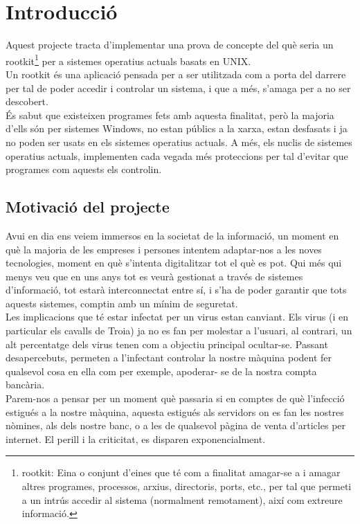 \chapter{Introducció}

Aquest projecte tracta d'implementar una prova de concepte del què seria un rootkit\footnote{rootkit:
Eina o conjunt d'eines que té com a finalitat amagar-se a i amagar altres programes, processos, arxius, 
directoris, ports, etc., per tal que permeti a un intrús accedir al sistema (normalment remotament), 
així com extreure informació.} per a sistemes operatius actuals basats en UNIX.\\ 

Un rootkit és una aplicació pensada per a ser utilitzada com a porta del darrere per tal de
poder accedir i controlar un sistema, i que a més, s'amaga per a no ser descobert.\\

És sabut que existeixen programes fets amb aquesta finalitat, però la majoria d'ells són
per sistemes Windows, no estan públics a la xarxa, estan desfasats i ja no poden ser
usats en els sistemes operatius actuals. A més, els nuclis de sistemes operatius actuals, implementen cada vegada més
proteccions per tal d'evitar que programes com aquests els controlin.

\section{Motivació del projecte}

Avui en dia ens veiem immersos en la societat de la informació, un moment en què la
majoria de les empreses i persones intentem adaptar-nos a les noves tecnologies,
moment en què s'intenta digitalitzar tot el què es pot. Qui més qui menys veu que en uns anys tot es veurà gestionat a través de sistemes
d'informació, tot estarà interconnectat entre sí, i s'ha de poder garantir que tots aquests
sistemes, comptin amb un mínim de seguretat.\\


Les implicacions que té estar infectat per un virus estan canviant. Els virus (i en particular
els cavalls de Troia) ja no es fan per molestar a l'usuari, al contrari, un alt percentatge dels
virus tenen com a objectiu principal ocultar-se. Passant desapercebuts, permeten a l'infectant
controlar la nostre màquina podent fer qualsevol cosa en ella com per exemple, apoderar-
se de la nostra compta bancària.\\
Parem-nos a pensar per un moment què passaria si en comptes de què l'infecció estigués
a la nostre màquina, aquesta estigués als servidors on es fan les nostres nòmines, als dels
nostre banc, o a les de qualsevol pàgina de venta d'articles per internet. El perill i la
criticitat, es disparen exponencialment.\\


